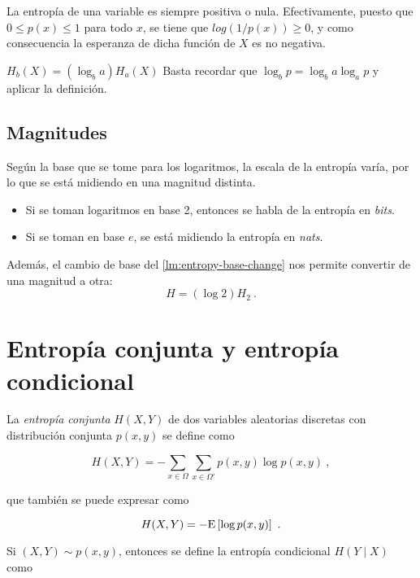 \lemmab
La entropía de una variable es siempre positiva o nula. \proofb
Efectivamente, puesto que \(0\leq p(x)\leq 1\) para todo \(x\), se tiene
que \(log(1/p(x))\geq 0\), y como consecuencia la esperanza de dicha
función de \(X\) es no negativa. \proofe
\lemmae

\lemmab
\(H_b(X)=\left(\log_b a\right)H_a(X)\) \label{lm:entropy-base-change}
\proofb
Basta recordar que \(\log_{b}p=\log_{b}a\log_a p\) y aplicar la
definición. \proofe
\lemmae

\subsection{Magnitudes}\label{magnitudes}

Según la base que se tome para los logaritmos, la escala de la entropía
varía, por lo que se está midiendo en una magnitud distinta.

\begin{itemize}
\tightlist
\item
  Si se toman logaritmos en base 2, entonces se habla de la entropía en
  \emph{bits}.
\item
  Si se toman en base \(e\), se está midiendo la entropía en
  \emph{nats}.
\end{itemize}

Además, el cambio de base del
\autoref{lm:entropy-base-change}
nos permite convertir de una magnitud a otra: \[H=(\log 2) H_2~.\]

\section{Entropía conjunta y entropía
condicional}\label{entropuxeda-conjunta-y-entropuxeda-condicional}

La \emph{entropía conjunta} \(H(X,Y)\) de dos variables aleatorias
discretas con distribución conjunta \(p(x,y)\) se define como

\begin{equation}H(X,Y)=-\sum_{x\in\Omega}\sum_{x\in\Omega'}p(x,y)\log p(x,y)~,\end{equation}

que también se puede expresar como

\begin{equation}H(X,Y)=-\mathrm{E}\left[\log p(x,y)\right]~.\end{equation}


Si \((X,Y)\sim p(x,y)\), entonces se define la entropía condicional
\(H(Y\mid X)\) como

